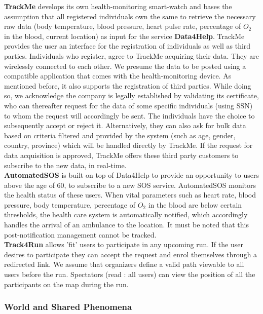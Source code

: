 \documentclass[12pt]{article}
\begin{document}
\textbf{TrackMe} develops its own health-monitoring smart-watch and bases the assumption that all registered individuals own the same to retrieve the necessary raw data (body temperature, blood pressure, heart pulse rate, percentage of $O_2$ in the blood, current location)  as input for the service \textbf{Data4Help}. TrackMe provides the user an interface for the registration of individuals as well as third parties. Individuals who register, agree to TrackMe acquiring their data. They are wirelessly connected to each other. We presume the data to be posted using a compatible application that comes with the health-monitoring device. As mentioned before, it also supports the registration of third parties. While doing so, we acknowledge the company is legally established by validating its certificate, who can thereafter request for the data of some specific individuals (using SSN) to whom the request will accordingly be sent. The individuals have the choice to subsequently accept or reject it. Alternatively, they can also ask for bulk data based on criteria filtered and provided by the system (such as age, gender, country, province) which will be handled directly by TrackMe. If the request for data acquisition is approved, TrackMe offers these third party customers to subscribe to the new data, in real-time.\\
\textbf{AutomatedSOS} is built on top of Data4Help to provide an opportunity to users above the age of 60, to subscribe to a new SOS service. AutomatedSOS monitors the health status of these users. When vital parameters  such as heart rate, blood pressure, body temperature, percentage of $O_2$ in the blood are below certain thresholds, the health care system is automatically notified, which accordingly handles the arrival of an ambulance to the location. It must be noted that this post-notification management cannot be tracked.\\

\textbf{Track4Run} allows 'fit' users to participate in any upcoming run. If the user desires to participate they can accept the request and enrol themselves through a redirected link.  We assume that organizers define a valid path viewable to all users before the run. Spectators (read : all users) can view the position of all the participants on the map during the run. \\

\subsubsection{World and Shared Phenomena}
\end{document}
